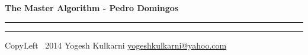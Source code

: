 % 


\graphicspath{{./images/}}
\usepackage{beamerarticle} %



\begin{center}
     \Large{\textbf{The Master Algorithm - Pedro Domingos}}  %
\end{center}
\rule{\linewidth}{0.25pt}
\raggedright
\footnotesize
\begin{multicols}{3}




\rule{0.3\linewidth}{0.25pt}

\scriptsize
CopyLeft \textcopyleft\ 2014 Yogesh Kulkarni
\href{http://www.yogeshkulkarni.com}{yogeshkulkarni@yahoo.com}

\end{multicols}

